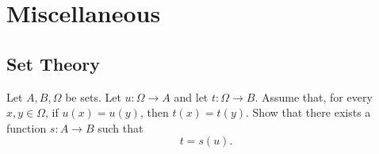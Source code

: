 %
%
%
%
%
%
%
%
%
%
%
%




\chapter{Miscellaneous}

\section{Set Theory}

\begin{proposition} Let $A,B,\Omega$ be sets.  Let $u:\Omega\to A$ and let $t:\Omega\to B$.  Assume that, for every $x,y\in\Omega$, if $u(x)=u(y)$, then $t(x)=t(y)$.  Show that there exists a function $s: A\to B$ such that
$$t=s(u).$$

\end{proposition}

